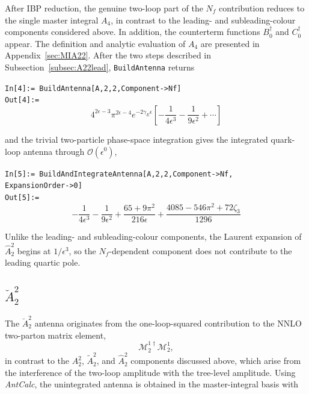 After IBP reduction, the genuine two-loop part of the $N_f$ contribution reduces to the single master integral $A_4$, in contrast to the leading- and subleading-colour components considered above. In addition, the counterterm functions $B_0^\dagger$ and $C_0^\dagger$ appear. The definition and analytic evaluation of $A_4$ are presented in
Appendix~\ref{sec:MIA22}. After the two steps described in Subsection~\ref{subsec:A22lead}, \texttt{BuildAntenna}
returns

\begin{mdframed}[backgroundcolor=gray!10, linewidth=0pt]
\texttt{In[4]:= BuildAntenna[A,2,2,Component->Nf]}\\
\hfill
\texttt{Out[4]:=}
    \begin{equation*}
4^{2\epsilon-3}\pi^{2\epsilon-4}e^{-2\gamma_E\epsilon}\left[-\frac1{4\epsilon^3}-\frac1{9\epsilon^2}+\cdots\right]
    \end{equation*}
\end{mdframed}

and the trivial two-particle phase-space integration gives the integrated quark-loop antenna through
$\mathcal O(\epsilon^0)$,

\begin{mdframed}[backgroundcolor=gray!10, linewidth=0pt]
\texttt{In[5]:= BuildAndIntegrateAntenna[A,2,2,Component->Nf,\\ExpansionOrder->0]}\\
\hfill
\texttt{Out[5]:=}
    \begin{equation*}
        -\frac1{4\epsilon^3}-\frac1{9\epsilon^2}+\frac{65+9\pi^2}{216\epsilon}+\frac{4085-546\pi^2+72\zeta_3}{1296}
    \end{equation*}
\end{mdframed}

Unlike the leading- and subleading-colour components, the Laurent expansion of $\hat A_2^2$ begins at
$1/\epsilon^3$, so the $N_f$-dependent component does not contribute to the leading quartic pole.

\subsection{$\breve A_2^2$}

The $\breve A_2^2$ antenna originates from the one-loop-squared contribution to the NNLO two-parton
matrix element,
\begin{equation*}
    \mathcal M_2^{1\dagger}\mathcal M_2^1,
\end{equation*}
in contrast to the $A_2^2$, $\tilde A_2^2$, and $\hat A_2^2$ components discussed above, which arise
from the interference of the two-loop amplitude with the tree-level amplitude.
Using \textit{AntCalc}, the unintegrated antenna is obtained in the master-integral basis with


